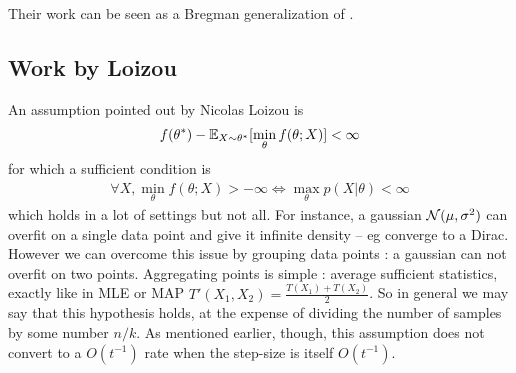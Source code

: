 \documentclass{article}
\newcommand{\nat}{\theta}
\begin{document}
Their work can be seen as a Bregman generalization of \citet{gower2019sgd}.

\subsection{Work by Loizou}
An assumption pointed out by Nicolas Loizou is 
\begin{align}
	f(\nat^*) - \E_{X\sim\nat^*}[\min_\nat f(\nat ; X)] < \infty
\end{align}
for which a sufficient condition is 
\begin{align}
\forall X, \min_\nat f(\nat ; X) >	 - \infty \iff \max_\nat p(X|\nat) < \infty
\end{align}
which holds in a lot of settings but not all. For instance, a gaussian ${\mathcal N}(\mu,\sigma^2)$ can overfit on a single data point and give it infinite density -- eg converge to a Dirac. However we can overcome this issue by grouping data points : a gaussian can not overfit on two points. Aggregating points is simple : average sufficient statistics, exactly like in MLE or MAP $T'(X_1,X_2) = \frac{T(X_1) + T(X_2)}{2}$. 
So in general we may say that this hypothesis holds, at the expense of dividing the number of samples by some number $n/k$.
As mentioned earlier, though, this assumption does not convert to a $O(t^{-1})$ rate when the step-size is itself $O(t^{-1})$.
\end{document}

